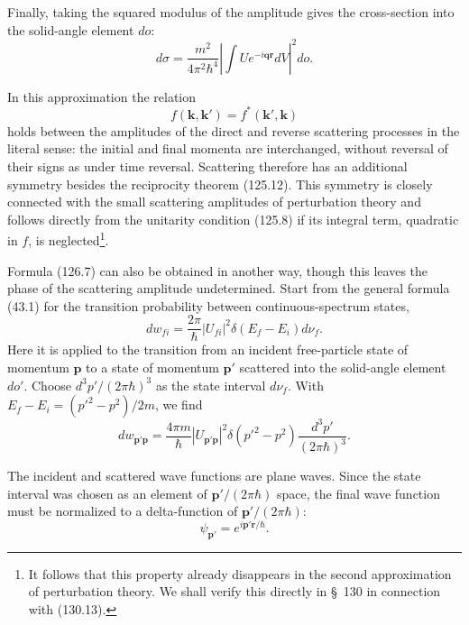 Finally, taking the squared modulus of the amplitude gives the cross-section
into the solid-angle element $do$:
\begin{equation}
 d\sigma=\frac{m^2}{4\pi^2\hbar^4}
 \left|\int Ue^{-i\mathbf{qr}}dV\right|^2do.
 \tag{126.7}
\end{equation}




In this approximation the relation
\begin{equation}
 f(\mathbf k,\mathbf k')=f^*(\mathbf k',\mathbf k)
 \tag{126.8}
\end{equation}
holds between the amplitudes of the direct and reverse scattering processes in
the literal sense: the initial and final momenta are interchanged, without
reversal of their signs as under time reversal. Scattering therefore has an
additional symmetry besides the reciprocity theorem (125.12). This symmetry is
closely connected with the small scattering amplitudes of perturbation theory
and follows directly from the unitarity condition (125.8) if its integral term,
quadratic in $f$, is neglected\footnote{It follows that this property already
disappears in the second approximation of perturbation theory. We shall verify
this directly in \S~130 in connection with (130.13).}.

Formula (126.7) can also be obtained in another way, though this leaves the
phase of the scattering amplitude undetermined. Start from the general formula
(43.1) for the transition probability between continuous-spectrum states,
\[
 dw_{fi}=\frac{2\pi}{\hbar}|U_{fi}|^2\delta(E_f-E_i)d\nu_f.
\]
Here it is applied to the transition from an incident free-particle state of
momentum $\mathbf p$ to a state of momentum $\mathbf p'$ scattered into the
solid-angle element $do'$. Choose $d^3p'/(2\pi\hbar)^3$ as the state interval
$d\nu_f$. With $E_f-E_i=(p'^2-p^2)/2m$, we find
\begin{equation}
 dw_{\mathbf p'\mathbf p}=\frac{4\pi m}{\hbar}|U_{\mathbf p'\mathbf p}|^2
 \delta(p'^2-p^2)\frac{d^3p'}{(2\pi\hbar)^3}.
 \tag{126.9}
\end{equation}

The incident and scattered wave functions are plane waves. Since the state
interval was chosen as an element of $\mathbf p'/(2\pi\hbar)$ space, the final
wave function must be normalized to a delta-function of
$\mathbf p'/(2\pi\hbar)$:
\begin{equation}
 \psi_{\mathbf p'}=e^{i\mathbf p'\mathbf r/\hbar}.
 \tag{126.10}
\end{equation}

